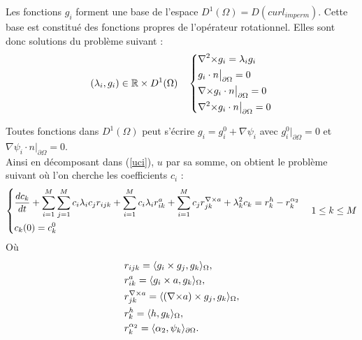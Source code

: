 Les fonctions $g_i$ forment une base de l'espace $D^1(\Omega) = D(curl_{imperm})$. Cette base est constitué des fonctions propres de l'opérateur rotationnel. Elles sont donc solutions du problème suivant :
\begin{eqnarray}
\label{curlcurl}
(\lambda_i,g_i)\in{\mathbb{R}}\times D^1(\Omega)\quad \left\{
\begin{aligned}
&{\nabla^2\times}  g_i = \lambda_i g_i\\
&g_i\cdot n\big\rvert_{\partial\Omega} = 0\\
&{\nabla\times} g_i\cdot n\big\rvert_{\partial\Omega} = 0\\
&{\nabla^2\times}  g_i\cdot n\big\rvert_{\partial\Omega} = 0
\end{aligned}
\right.
\end{eqnarray}

Toutes fonctions dans $D^1(\Omega)$ peut s'écrire $g_i=g_i^0+\nabla\psi_i$ avec $g_i^0\big\rvert_{\partial\Omega} = 0$ et $ \nabla\psi_i\cdot n\big\rvert_{\partial\Omega} = 0$.\\
Ainsi en décomposant dans (\ref{uci}), $u$ par sa somme, on obtient le problème suivant où l'on cherche les coefficients $c_i$ :\\
\begin{eqnarray}
\label{cigi}
\left\{
\begin{aligned}
&\frac{dc_k}{dt}+\sum_{i=1}^M\sum_{j=1}^M c_i\lambda_i c_j r_{ijk} + \sum_{i=1}^M c_i\lambda_i r_{ik}^a + \sum_{i=1}^M c_j r_{jk}^{{\nabla\times} a} + \lambda_k^2 c_k = r_k^h - r_k^{\alpha_2}\\
&c_k(0)=c_k^0
\end{aligned}
\right.\quad
1\leq k\leq M
\end{eqnarray}
Où\\
\[
\begin{aligned}
&r_{ijk} = \langle g_i\times g_j, g_k\rangle_\Omega,\\
&r_{ik}^a=\langle g_i\times a, g_k\rangle_\Omega,\\
&r_{jk}^{{\nabla\times} a}=\langle ({\nabla\times} a)\times g_j, g_k\rangle_\Omega,\\
&r_k^h=\langle h,g_k\rangle_\Omega,\\
&r_k^{\alpha_2} = \langle \alpha_2,\psi_k\rangle_{\partial\Omega}.
\end{aligned}
\]

